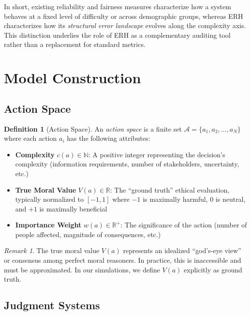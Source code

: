 \documentclass[12pt,a4paper]{article}
\theoremstyle{definition}
\newtheorem{definition}[theorem]{Definition}
\theoremstyle{remark}
\newtheorem{remark}[theorem]{Remark}
\begin{document}
In short, existing reliability and fairness measures characterize how a system behaves at a fixed level of difficulty or across demographic groups, whereas ERH characterizes how its \emph{structural error landscape} evolves along the complexity axis.
This distinction underlies the role of ERH as a complementary auditing tool rather than a replacement for standard metrics.

\section{Model Construction}
\label{sec:formalization}

\subsection{Action Space}

\begin{definition}[Action Space]
An \emph{action space} is a finite set $\mathcal{A} = \{a_1, a_2, \ldots, a_N\}$ where each action $a_i$ has the following attributes:
\begin{itemize}
    \item \textbf{Complexity} $c(a) \in \mathbb{N}$: A positive integer representing the decision's complexity (information requirements, number of stakeholders, uncertainty, etc.)
    \item \textbf{True Moral Value} $V(a) \in \mathbb{R}$: The ``ground truth'' ethical evaluation, typically normalized to $[-1, 1]$ where $-1$ is maximally harmful, $0$ is neutral, and $+1$ is maximally beneficial
    \item \textbf{Importance Weight} $w(a) \in \mathbb{R}^+$: The significance of the action (number of people affected, magnitude of consequences, etc.)
\end{itemize}
\end{definition}

\begin{remark}
The true moral value $V(a)$ represents an idealized ``god's-eye view'' or consensus among perfect moral reasoners. In practice, this is inaccessible and must be approximated. In our simulations, we define $V(a)$ explicitly as ground truth.
\end{remark}

\subsection{Judgment Systems}
\end{document}
